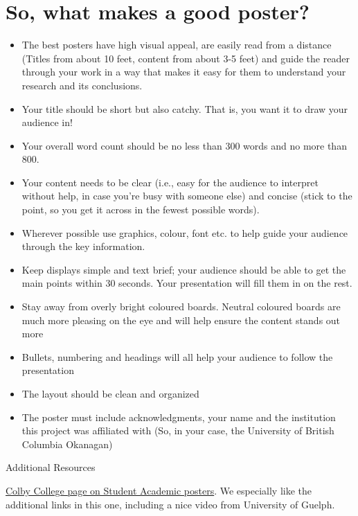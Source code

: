 \documentclass[
]{book}
\providecommand{\tightlist}{%
  \setlength{\itemsep}{0pt}\setlength{\parskip}{0pt}}
\begin{document}
\hypertarget{so-what-makes-a-good-poster}{%
\section*{So, what makes a good poster?}\label{so-what-makes-a-good-poster}}

\begin{itemize}
\tightlist
\item
  The best posters have high visual appeal, are easily read from a distance (Titles from about 10 feet, content from about 3-5 feet) and guide the reader through your work in a way that makes it easy for them to understand your research and its conclusions.
\item
  Your title should be short but also catchy. That is, you want it to draw your audience in!
\item
  Your overall word count should be no less than 300 words and no more than 800.
\item
  Your content needs to be clear (i.e., easy for the audience to interpret without help, in case you're busy with someone else) and concise (stick to the point, so you get it across in the fewest possible words).
\item
  Wherever possible use graphics, colour, font etc. to help guide your audience through the key information.
\item
  Keep displays simple and text brief; your audience should be able to get the main points within 30 seconds. Your presentation will fill them in on the rest.
\item
  Stay away from overly bright coloured boards. Neutral coloured boards are much more pleasing on the eye and will help ensure the content stands out more
\item
  Bullets, numbering and headings will all help your audience to follow the presentation
\item
  The layout should be clean and organized
\item
  The poster must include acknowledgments, your name and the institution this project was affiliated with (So, in your case, the University of British Columbia Okanagan)
\end{itemize}

Additional Resources

\href{http://www.colby.edu/acits/student-academic-poster-guidelines/}{Colby College page on Student Academic posters}. We especially like the additional links in this one, including a nice video from University of Guelph.
\end{document}
